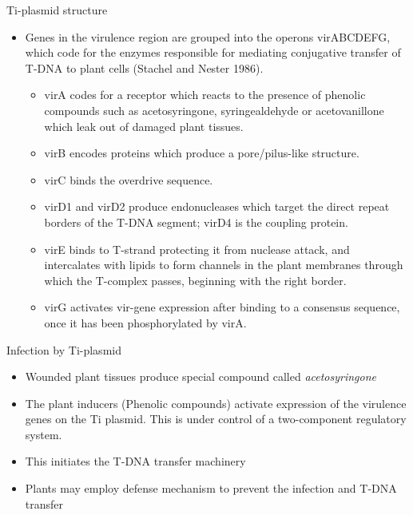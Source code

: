 \documentclass[
  ignorenonframetext,
  aspectratio=169]{beamer}
\providecommand{\tightlist}{%
  \setlength{\itemsep}{0pt}\setlength{\parskip}{0pt}}
\begin{document}
\begin{frame}{Ti-plasmid structure}
\protect\hypertarget{ti-plasmid-structure-1}{}
\begin{itemize}
\tightlist
\item
  Genes in the virulence region are grouped into the operons virABCDEFG,
  which code for the enzymes responsible for mediating conjugative
  transfer of T-DNA to plant cells (Stachel and Nester 1986).

  \begin{itemize}
  \tightlist
  \item
    virA codes for a receptor which reacts to the presence of phenolic
    compounds such as acetosyringone, syringealdehyde or acetovanillone
    which leak out of damaged plant tissues.
  \item
    virB encodes proteins which produce a pore/pilus-like structure.
  \item
    virC binds the overdrive sequence.
  \item
    virD1 and virD2 produce endonucleases which target the direct repeat
    borders of the T-DNA segment; virD4 is the coupling protein.
  \item
    virE binds to T-strand protecting it from nuclease attack, and
    intercalates with lipids to form channels in the plant membranes
    through which the T-complex passes, beginning with the right border.
  \item
    virG activates vir-gene expression after binding to a consensus
    sequence, once it has been phosphorylated by virA.
  \end{itemize}
\end{itemize}
\end{frame}

\begin{frame}{Infection by Ti-plasmid}
\protect\hypertarget{infection-by-ti-plasmid}{}
\begin{itemize}
\tightlist
\item
  Wounded plant tissues produce special compound called
  \emph{acetosyringone}
\item
  The plant inducers (Phenolic compounds) activate expression of the
  virulence genes on the Ti plasmid. This is under control of a
  two-component regulatory system.
\item
  This initiates the T-DNA transfer machinery
\item
  Plants may employ defense mechanism to prevent the infection and T-DNA
  transfer
\end{itemize}
\end{frame}
\end{document}
